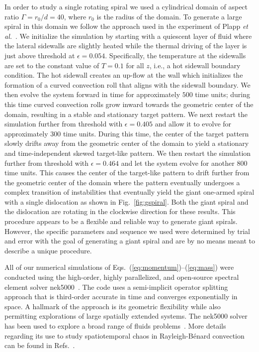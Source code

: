 \documentclass[preprint,prx,floatfix]{revtex4-1}
\begin{document}
In order to study a single rotating spiral we used a cylindrical domain of aspect ratio $\Gamma \! = r_0/d \! = \! 40$, where $r_0$ is the radius of the domain. To generate a large spiral in this domain we follow the approach used in the experiment of Plapp \emph{et al.}~\cite{plapp1998}. We initialize the simulation by starting with a quiescent layer of fluid where the lateral sidewalls are slightly heated while the thermal driving of the layer is just above threshold at $\epsilon = 0.054$. Specifically, the temperature at the sidewalls are set to the constant value of $T=0.1$ for all $z$, i.e., a hot sidewall boundary condition. The hot sidewall creates an up-flow at the wall which initializes the formation of a curved convection roll that aligns with the sidewall boundary. We then evolve the system forward in time for approximately $500$ time units; during this time curved convection rolls grow inward towards the geometric center of the domain, resulting in a stable and stationary target pattern. We next restart the simulation further from threshold with $\epsilon = 0.405$ and allow it to evolve for approximately $300$ time units. During this time, the center of the target pattern slowly drifts away from the geometric center of the domain to yield a stationary and time-independent skewed target-like pattern. We then restart the simulation further from threshold with $\epsilon = 0.464$ and let the system evolve for another $800$ time units. This causes the center of the target-like pattern to drift further from the geometric center of the domain where the pattern eventually undergoes a complex transition of instabilities that eventually yield the giant one-armed spiral with a single dislocation as shown in Fig.~\ref{fig:gspiral}. Both the giant spiral and the dislocation are rotating in the clockwise direction for these results.  This procedure appears to be a flexible and reliable way to generate giant spirals. However, the specific parameters and sequence we used were determined by trial and error with the goal of generating a giant spiral and are by no means meant to describe a unique procedure.

All of our numerical simulations of Eqs.~(\ref{eq:momentum})--(\ref{eq:mass}) were conducted using the high-order, highly parallelized, and open-source spectral element solver nek5000~\cite{nek5000,fischer1997,deville2002}.  The code uses a semi-implicit operator splitting approach that is third-order accurate in time and converges exponentially in space. A hallmark of the approach is its geometric flexibility while also permitting explorations of large spatially extended systems. The nek5000 solver has been used to explore a broad range of fluids problems~\cite{deville2002}. More details regarding its use to study spatiotemporal chaos in Rayleigh-B\'enard convection can be found in Refs.~\cite{paul2003pattern,scheel:2006,jayaraman:2006,paul:2007,karimi:2012}.
\end{document}
